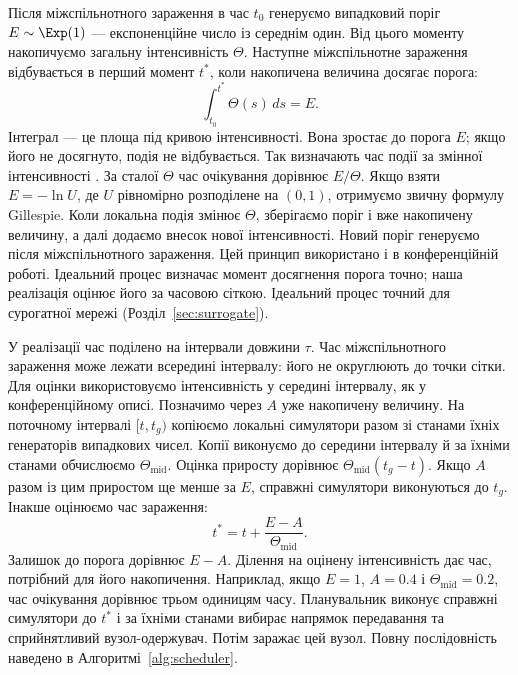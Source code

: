 Після міжспільнотного зараження в час $t_0$ генеруємо випадковий поріг $E\sim\Exp(1)$ --- експоненційне число із середнім один. Від цього моменту накопичуємо загальну інтенсивність $\Theta$. Наступне міжспільнотне зараження відбувається в перший момент $t^\ast$, коли накопичена величина досягає порога:
\begin{equation}
\label{eq:hazard_integral}
\int_{t_0}^{t^\ast}\Theta(s)\,ds=E.
\end{equation}
Інтеграл --- це площа під кривою інтенсивності. Вона зростає до порога $E$; якщо його не досягнуто, подія не відбувається. Так визначають час події за змінної інтенсивності \citep{ethier1986,anderson2007}. За сталої $\Theta$ час очікування дорівнює $E/\Theta$. Якщо взяти $E=-\ln U$, де $U$ рівномірно розподілене на $(0,1)$, отримуємо звичну формулу Gillespie. Коли локальна подія змінює $\Theta$, зберігаємо поріг і вже накопичену величину, а далі додаємо внесок нової інтенсивності. Новий поріг генеруємо після міжспільнотного зараження. Цей принцип використано і в конференційній роботі. Ідеальний процес визначає момент досягнення порога точно; наша реалізація оцінює його за часовою сіткою. Ідеальний процес точний для сурогатної мережі (Розділ~\ref{sec:surrogate}).

У реалізації час поділено на інтервали довжини $\tau$. Час міжспільнотного зараження може лежати всередині інтервалу: його не округлюють до точки сітки. Для оцінки використовуємо інтенсивність у середині інтервалу, як у конференційному описі. Позначимо через $A$ уже накопичену величину. На поточному інтервалі $[t,t_g)$ копіюємо локальні симулятори разом зі станами їхніх генераторів випадкових чисел. Копії виконуємо до середини інтервалу й за їхніми станами обчислюємо $\Theta_{\mathrm{mid}}$. Оцінка приросту дорівнює $\Theta_{\mathrm{mid}}(t_g-t)$. Якщо $A$ разом із цим приростом ще менше за $E$, справжні симулятори виконуються до $t_g$. Інакше оцінюємо час зараження:
\begin{equation}
\label{eq:interpolation}
t^\ast=t+\frac{E-A}{\Theta_{\mathrm{mid}}}.
\end{equation}
Залишок до порога дорівнює $E-A$. Ділення на оцінену інтенсивність дає час, потрібний для його накопичення. Наприклад, якщо $E=1$, $A=0.4$ і $\Theta_{\mathrm{mid}}=0.2$, час очікування дорівнює трьом одиницям часу. Планувальник виконує справжні симулятори до $t^\ast$ і за їхніми станами вибирає напрямок передавання та сприйнятливий вузол-одержувач. Потім заражає цей вузол. Повну послідовність наведено в Алгоритмі~\ref{alg:scheduler}.


